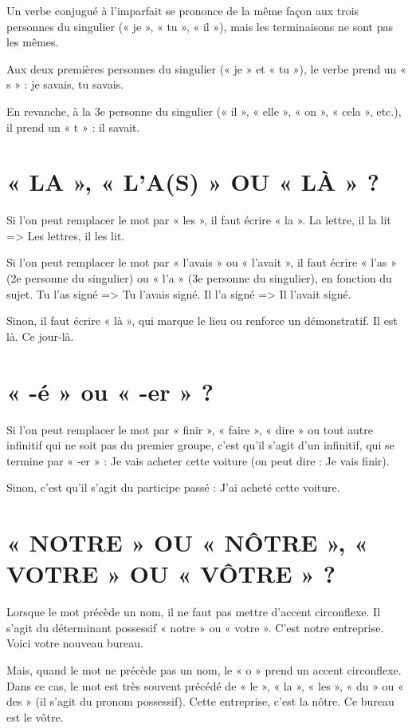 Un verbe conjugué à l'imparfait se prononce de la même façon aux trois personnes du singulier (« je », « tu », « il »), mais les terminaisons ne sont pas les mêmes.

Aux deux premières personnes du singulier (« je » et « tu »), le verbe prend un « s » : je savais, tu savais.

En revanche, à la 3e personne du singulier (« il », « elle », « on », « cela », etc.), il prend un « t » : il savait.


\section{« LA », « L'A(S) » OU « LÀ » ?}

Si l'on peut remplacer le mot par « les », il faut écrire « la ».
La lettre, il la lit => Les lettres, il les lit.

Si l'on peut remplacer le mot par « l'avais » ou « l'avait », il faut écrire « l'as » (2e personne du singulier) ou « l'a » (3e personne du singulier), en fonction du sujet.
Tu l'as signé => Tu l'avais signé.
Il l'a signé => Il l'avait signé.

Sinon, il faut écrire « là », qui marque le lieu ou renforce un démonstratif.
Il est là.
Ce jour‑là.

\section{« -é » ou « -er » ?}

Si l'on peut remplacer le mot par « finir », « faire », « dire » ou tout autre infinitif qui ne soit pas du premier groupe, c'est qu'il s'agit d'un infinitif, qui se termine par « ‑er » : Je vais acheter cette voiture (on peut dire : Je vais finir).

Sinon, c'est qu'il s'agit du participe passé : J'ai acheté cette voiture.



\section{« NOTRE » OU « NÔTRE », « VOTRE » OU « VÔTRE » ?}

Lorsque le mot précède un nom, il ne faut pas mettre d'accent circonflexe. Il s'agit du déterminant possessif « notre » ou « votre ».
C'est notre entreprise.
Voici votre nouveau bureau.

Mais, quand le mot ne précède pas un nom, le « o » prend un accent circonflexe.
Dans ce cas, le mot est très souvent précédé de « le », « la », « les », « du » ou « des » (il s'agit du pronom possessif).
Cette entreprise, c'est la nôtre.
Ce bureau est le vôtre.

